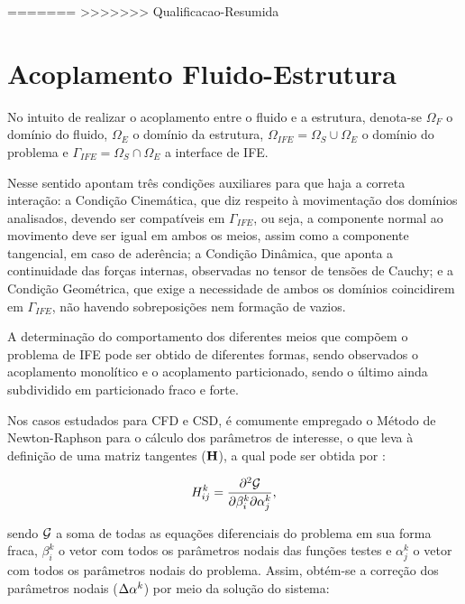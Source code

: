 \documentclass[_ArquivoPrincipal.tex]{subfiles}
\begin{document}
=======
>>>>>>> Qualificacao-Resumida
\section{Acoplamento Fluido-Estrutura} \label{AFE}

No intuito de realizar o acoplamento entre o fluido e a estrutura, denota-se $\Omega_F$ o domínio do fluido, $\Omega_E$ o domínio da estrutura, $\Omega_{IFE}=\Omega_S\cup\Omega_E$ o domínio do problema e $\Gamma_{IFE}=\Omega_S\cap\Omega_E$ a interface de IFE.

Nesse sentido  apontam três condições auxiliares para que haja a correta interação: a Condição Cinemática, que diz respeito à movimentação dos domínios analisados, devendo ser compatíveis em $\Gamma_{IFE}$, ou seja, a componente normal ao movimento deve ser igual em ambos os meios, assim como a componente tangencial, em caso de aderência; a Condição Dinâmica, que aponta a continuidade das forças internas, observadas no tensor de tensões de Cauchy; e a Condição Geométrica, que exige a necessidade de ambos os domínios coincidirem em $\Gamma_{IFE}$, não havendo sobreposições nem formação de vazios.

A determinação do comportamento dos diferentes meios que compõem o problema de IFE pode ser obtido de diferentes formas, sendo observados o acoplamento monolítico e o acoplamento particionado, sendo o último ainda subdividido em particionado fraco e forte.

Nos casos estudados para CFD e CSD, é comumente empregado o Método de Newton-Raphson para o cálculo dos parâmetros de interesse, o que leva à definição de uma matriz tangentes ($\mathbf{H}$), a qual pode ser obtida por \cite{bazilevs2013computational,sanches2022metodos}:

\begin{equation}
    H_{ij}^k=\frac{\partial^2{\mathcal{G}}}{\partial{\beta_i^k}\partial{\alpha_j^k}}\text{,}
\end{equation}

\noindent sendo $\mathcal{G}$ a soma de todas as equações diferenciais do problema em sua forma fraca, $\beta_i^k$ o vetor com todos os parâmetros nodais das funções testes e $\alpha_j^k$ o vetor com todos os parâmetros nodais do problema. Assim, obtém-se a correção dos parâmetros nodais ($\Delta\mathbf{\alpha}^k$) por meio da solução do sistema:
\end{document}
